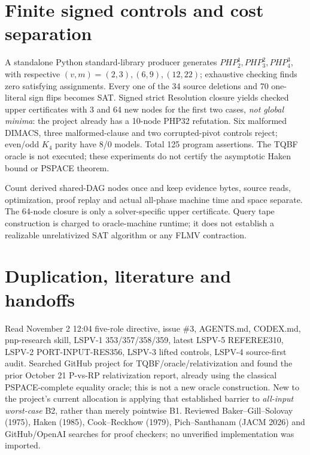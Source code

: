 \documentclass[11pt]{article}
\begin{document}
\section*{Finite signed controls and cost separation}
A standalone Python standard-library producer generates $PHP_2^1,PHP_3^2,PHP_4^3$, with respective $(v,m)=(2,3),(6,9),(12,22)$; exhaustive checking finds zero satisfying assignments. Every one of the 34 source deletions and 70 one-literal sign flips becomes SAT. Signed strict Resolution closure yields checked upper certificates with 3 and 64 new nodes for the first two cases, \emph{not global minima}: the project already has a 10-node PHP32 refutation. Six malformed DIMACS, three malformed-clause and two corrupted-pivot controls reject; even/odd $K_4$ parity have 8/0 models. Total 125 program assertions. The TQBF oracle is not executed; these experiments do not certify the asymptotic Haken bound or PSPACE theorem.

Count derived shared-DAG nodes once and keep evidence bytes, source reads, optimization, proof replay and actual all-phase machine time and space separate. The 64-node closure is only a solver-specific upper certificate. Query tape construction is charged to oracle-machine runtime; it does not establish a realizable unrelativized SAT algorithm or any FLMV contraction.

\section*{Duplication, literature and handoffs}
Read November 2 12:04 five-role directive, issue \#3, AGENTS.md, CODEX.md, pnp-research skill, LSPV-1 353/357/358/359, latest LSPV-5 REFEREE310, LSPV-2 PORT-INPUT-RES356, LSPV-3 lifted controls, LSPV-4 source-first audit. Searched GitHub project for TQBF/oracle/relativization and found the prior October 21 P-vs-RP relativization report, already using the classical PSPACE-complete equality oracle; this is not a new oracle construction. New to the project's current allocation is applying that established barrier to \emph{all-input worst-case} B2, rather than merely pointwise B1. Reviewed Baker--Gill--Solovay (1975), Haken (1985), Cook--Reckhow (1979), Pich--Santhanam (JACM 2026) and GitHub/OpenAI searches for proof checkers; no unverified implementation was imported.
\end{document}
